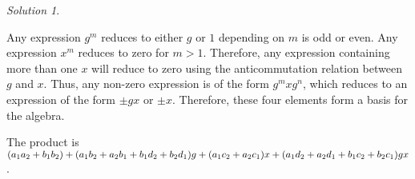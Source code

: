 \documentclass[svgnames]{article}
\theoremstyle{definition}
\theoremstyle{remark}
\newtheorem*{Solution*}{Solution}
\theoremstyle{underline}
\theoremstyle{underline}
\begin{document}
	\begin{Solution*}
		\begin{subquests}
			\item Any expression $g^m$ reduces to either $g$ or $1$ depending on $m$ is odd or even. Any expression $x^m$ reduces to zero for $m > 1$. Therefore, any expression containing more than one $x$ will reduce to zero using the anticommutation relation between $g$ and $x$. Thus, any non-zero expression is of the form $g^m x g^n$, which reduces to an expression of the form $\pm gx$ or $\pm x$. Therefore, these four elements form a basis for the algebra.
			
			\item The product is $\pqty{a_1 a_2 + b_1 b_2} + \pqty{a_1 b_2 + a_2 b_1 + b_1 d_2 + b_2 d_1}g + \pqty{a_1 c_2 + a_2 c_1}x + \pqty{a_1 d_2 + a_2 d_1 + b_1 c_2 + b_2 c_1}gx $.
			

\end{subquests}
\end{Solution*}
\end{document}
